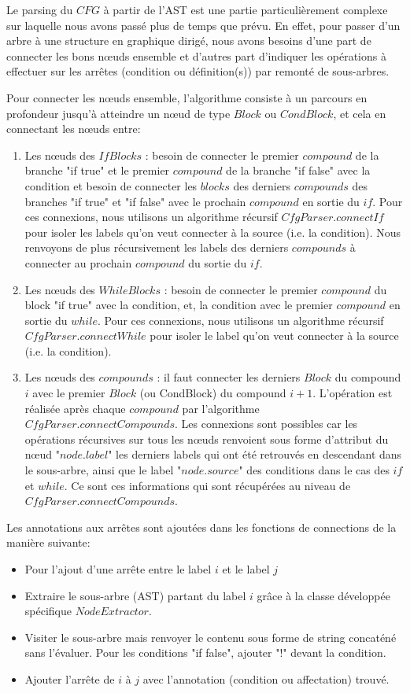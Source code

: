 \documentclass[a4paper]{article}
\begin{document}
Le parsing du $CFG$ à partir de l'AST est une partie particulièrement complexe sur laquelle nous avons passé plus de temps que prévu. En effet, pour passer d'un arbre à une structure en graphique dirigé, nous avons besoins d'une part de connecter les bons nœuds ensemble et d'autres part d'indiquer les opérations à effectuer sur les arrêtes (condition ou définition(s)) par remonté de sous-arbres. 

Pour connecter les nœuds ensemble, l’algorithme consiste à un parcours en profondeur jusqu'à atteindre un nœud de type $Block$ ou $CondBlock$, et cela en connectant les nœuds entre:
\begin{enumerate}
\item Les nœuds des $IfBlocks$ : besoin de connecter le premier $compound$ de la branche "if true" et le premier $compound$ de la branche "if false" avec la condition et besoin de connecter les $blocks$ des derniers $compounds$ des branches "if true" et "if false" avec le prochain $compound$ en sortie du $if$. Pour ces connexions, nous utilisons un algorithme récursif $CfgParser.connectIf$ pour isoler les labels qu'on veut connecter à la source (i.e. la condition). Nous renvoyons de plus récursivement les labels des derniers $compounds$ à connecter au prochain $compound$ du sortie du $if$. 
\item Les nœuds des $WhileBlocks$ : besoin de connecter le premier $compound$ du block "if true" avec la condition, et, la condition avec le premier $compound$ en sortie du $while$. Pour ces connexions, nous utilisons un algorithme récursif $CfgParser.connectWhile$ pour isoler le label qu'on veut connecter à la source (i.e. la condition). 
\item Les nœuds des $compounds$ : il faut connecter les derniers $Block$ du compound $i$ avec le premier $Block$ (ou CondBlock) du compound $i+1$. L'opération est réalisée après chaque $compound$ par l'algorithme $CfgParser.connectCompounds$. Les connexions sont possibles car les opérations récursives sur tous les nœuds renvoient sous forme d'attribut du nœud  "$node.label$" les derniers labels qui ont été retrouvés en descendant dans le sous-arbre, ainsi que le label "$node.source$" des conditions dans le cas des $if$ et $while$. Ce sont ces informations qui sont récupérées au niveau de $CfgParser.connectCompounds$. 
\end{enumerate}

Les annotations aux arrêtes sont ajoutées dans les fonctions de connections de la manière suivante:
\begin{itemize}
\item Pour l'ajout d'une arrête entre le label $i$ et le label $j$ 
\item Extraire le sous-arbre (AST) partant du label $i$ grâce à la classe développée spécifique $NodeExtractor$. 
\item Visiter le sous-arbre mais renvoyer le contenu sous forme de string concaténé sans l'évaluer. Pour les conditions "if false", ajouter "!" devant la condition. 
\item Ajouter l'arrête de $i$ à $j$ avec l'annotation (condition ou affectation) trouvé. 
\end{itemize}
\end{document}
